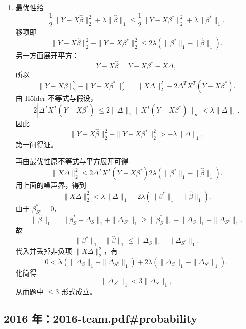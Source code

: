 \documentclass[UTF8,12pt]{ctexart}
\begin{document}
\begin{enumerate}[label=\textbf{\arabic*.},leftmargin=2.2em]
\item 最优性给
\[
\frac12\|Y-X\widehat\beta\|_2^2+\lambda\|\widehat\beta\|_1
\le
\frac12\|Y-X\beta^\ast\|_2^2+\lambda\|\beta^\ast\|_1.
\]
移项即
\[
\|Y-X\widehat\beta\|_2^2-\|Y-X\beta^\ast\|_2^2
\le 2\lambda(\|\beta^\ast\|_1-\|\widehat\beta\|_1).
\]
另一方面展开平方：
\[
Y-X\widehat\beta=Y-X\beta^\ast-X\Delta,
\]
所以
\[
\|Y-X\widehat\beta\|_2^2-\|Y-X\beta^\ast\|_2^2
=\|X\Delta\|_2^2-2\Delta^TX^T(Y-X\beta^\ast).
\]
由 Hölder 不等式与假设，
\[
2|\Delta^TX^T(Y-X\beta^\ast)|
\le 2\|\Delta\|_1\|X^T(Y-X\beta^\ast)\|_\infty
<\lambda\|\Delta\|_1.
\]
因此
\[
\|Y-X\widehat\beta\|_2^2-\|Y-X\beta^\ast\|_2^2
>-\lambda\|\Delta\|_1,
\]
第一问得证。

再由最优性原不等式与平方展开可得
\[
\|X\Delta\|_2^2
\le
2\Delta^TX^T(Y-X\beta^\ast)
2\lambda(\|\beta^\ast\|_1-\|\widehat\beta\|_1).
\]
用上面的噪声界，得到
\[
\|X\Delta\|_2^2
<\lambda\|\Delta\|_1+2\lambda(\|\beta^\ast\|_1-\|\widehat\beta\|_1).
\]
由于 \(\beta^\ast_{S^c}=0\)，
\[
\|\widehat\beta\|_1
=\|\beta^\ast_S+\Delta_S\|_1+\|\Delta_{S^c}\|_1
\ge \|\beta^\ast_S\|_1-\|\Delta_S\|_1+\|\Delta_{S^c}\|_1.
\]
故
\[
\|\beta^\ast\|_1-\|\widehat\beta\|_1
\le \|\Delta_S\|_1-\|\Delta_{S^c}\|_1.
\]
代入并丢掉非负项 \(\|X\Delta\|_2^2\)，有
\[
0<\lambda(\|\Delta_S\|_1+\|\Delta_{S^c}\|_1)
+2\lambda(\|\Delta_S\|_1-\|\Delta_{S^c}\|_1).
\]
化简得
\[
\|\Delta_{S^c}\|_1<3\|\Delta_S\|_1,
\]
从而题中 \(\le3\) 形式成立。
\end{enumerate}


\subsection{2016 年：2016-team.pdf\#probability}
\end{document}
